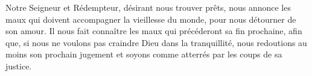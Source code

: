 Notre Seigneur et Rédempteur, désirant nous trouver prêts, nous annonce les maux qui doivent accompagner la vieillesse du monde, pour nous détourner de son amour. Il nous fait connaître les maux qui précéderont sa fin prochaine, afin que, si nous ne voulons pas craindre Dieu dans la tranquillité, nous redoutions au moins son prochain jugement et soyons comme atterrés par les coups de sa justice.